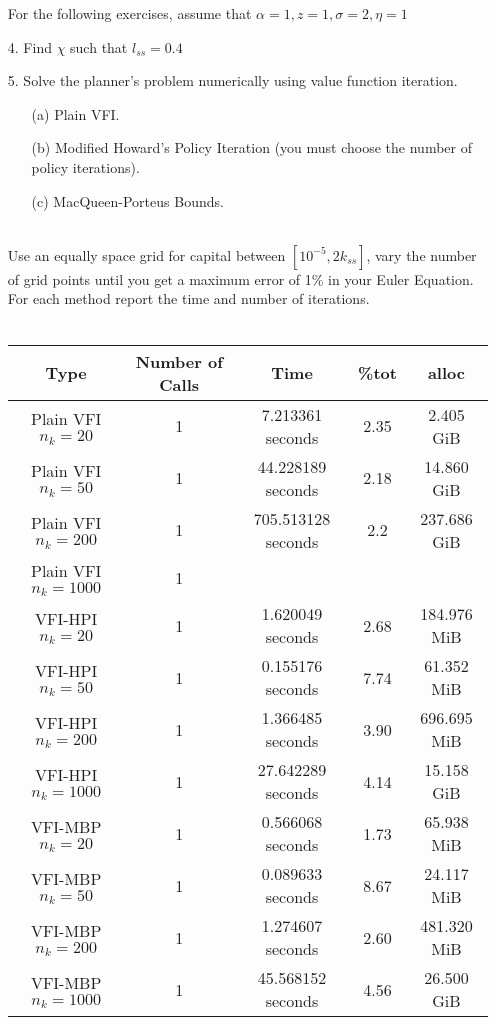 \documentclass[a4paper]{article}
\begin{document}
\begin{enumerate}
For the  following exercises, assume that $\alpha=1, z=1, \sigma=2, \eta = 1$
\item[4.] Find $\chi$ such that $l_{ss} = 0.4$
\item[5.] Solve the planner's problem numerically using value function iteration.
\begin{enumerate}
\item[(a)] Plain VFI.
\item[(b)] Modified Howard’s Policy Iteration (you must choose the number of policy iterations).
\item[(c)] MacQueen-Porteus Bounds.\\~\
\end{enumerate}

Use an equally space grid for capital between $[10^{-5}, 2k_{ss}]$, vary the number of grid points until you get a maximum error of 1\% in your Euler Equation. For each method report the time and number of iterations.\\~\

\begin{table}[htbp]
\centering
\begin{tabular}{|ccccc|}
\hline
Type & Number of Calls & Time & \%tot & alloc \\
\hline
Plain VFI $n_k=20$ & 1 & 7.213361 seconds  & 2.35 & 2.405 GiB\\
Plain VFI $n_k=50$ & 1 &  44.228189 seconds&  2.18 & 14.860 GiB \\
Plain VFI $n_k=200$ & 1 & 705.513128 seconds &  2.2 &  237.686 GiB \\
Plain VFI $n_k=1000$ &1  &  &  &  \\
VFI-HPI $n_k=20$ & 1 & 1.620049 seconds & 2.68  & 184.976 MiB  \\
VFI-HPI $n_k=50$& 1 &  0.155176 seconds & 7.74 &  61.352 MiB \\
VFI-HPI $n_k=200$& 1 &  1.366485 seconds & 3.90 & 696.695 MiB  \\
VFI-HPI $n_k=1000$&  1& 27.642289 seconds  &  4.14 & 15.158 GiB \\
VFI-MBP  $n_k=20$ &  1& 0.566068 seconds &  1.73 & 65.938 MiB  \\
VFI-MBP $n_k=50$& 1 &  0.089633 seconds & 8.67 & 24.117 MiB \\
VFI-MBP $n_k=200$& 1 & 1.274607 seconds & 2.60  & 481.320 MiB  \\
VFI-MBP $n_k=1000$&  1& 45.568152 seconds & 4.56 & 26.500 GiB
\end{tabular}
\end{table}


\end{enumerate}
\end{document}
